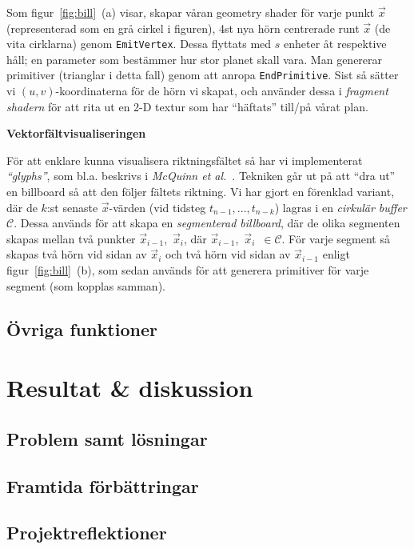 \documentclass[a4paper]{article}
\begin{document}
\begin{multicols}{2}
Som figur~\ref{fig:bill}~(a) visar, skapar våran geometry shader för varje punkt \(\vec{x}\) (representerad som en grå cirkel i figuren), 4st nya hörn centrerade runt \(\vec{x}\) (de vita cirklarna) genom \texttt{EmitVertex}. Dessa flyttats med \(s\) enheter åt respektive håll; en parameter som bestämmer hur stor planet skall vara. Man genererar primitiver (trianglar i detta fall) genom att anropa \texttt{EndPrimitive}. Sist så sätter vi \((u, v)\)-koordinaterna för de hörn vi skapat, och använder dessa i \emph{fragment shadern} för att rita ut en 2-D textur som har ``häftats'' till/på vårat plan.

\textbf{Vektorfältvisualiseringen}

För att enklare kunna visualisera riktningsfältet så har vi implementerat \emph{``glyphs''}, som bl.a. beskrivs i \emph{McQuinn et al.}~\cite{mcquinn2013glyphsea}. Tekniken går ut på att ``dra ut'' en billboard så att den följer fältets riktning. Vi har gjort en förenklad variant, där de \(k\):st senaste \(\vec{x}\)-värden (vid tidsteg \(t_{n-1}, ..., t_{n-k}\)) lagras i en \emph{cirkulär buffer} \(\mathcal{C}\). Dessa används för att skapa en \emph{segmenterad billboard}, där de olika segmenten skapas mellan två punkter \(\vec{x}_{i-1}\),~\(\vec{x}_i\), där \(\vec{x}_{i-1}\),~\(\vec{x}_i\)~\(\in \mathcal{C}\). För varje segment så skapas två hörn vid sidan av \(\vec{x}_i\) och två hörn vid sidan av \(\vec{x}_{i-1}\) enligt figur~\ref{fig:bill}~(b), som sedan används för att generera primitiver för varje segment (som kopplas samman).

\subsection{Övriga funktioner}

\section{Resultat \& diskussion} \label{sec:results}

        \subsection{Problem samt lösningar}

        \subsection{Framtida förbättringar}

        \subsection{Projektreflektioner}

    \nocite{*} %
    
    
\end{multicols}
\end{document}
